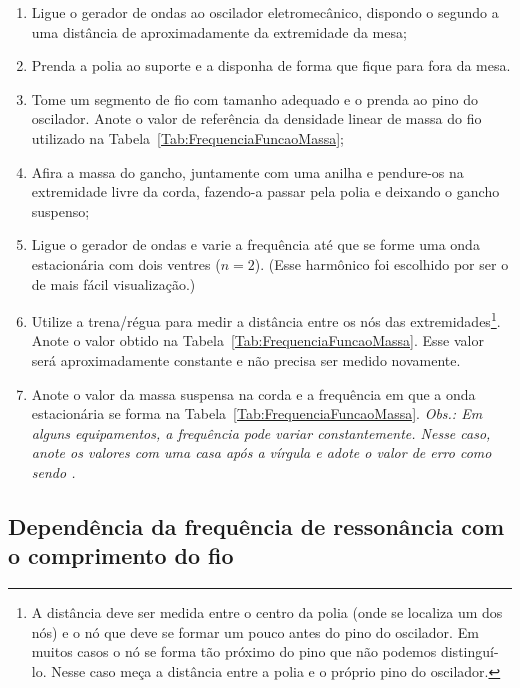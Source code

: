 \begin{enumerate}
\item Ligue o gerador de ondas ao oscilador eletromecânico, dispondo o segundo a uma distância de aproximadamente  da extremidade da mesa;\label{Enum:iteminicio}
\item Prenda a polia ao suporte e a disponha de forma que fique para fora da mesa.
\item Tome um segmento de fio com tamanho adequado e o prenda ao pino do oscilador. Anote o valor de referência da densidade linear de massa do fio utilizado na Tabela~\ref{Tab:FrequenciaFuncaoMassa};
\item Afira a massa do gancho, juntamente com uma anilha e pendure-os na extremidade livre da corda, fazendo-a passar pela polia e deixando o gancho suspenso;\label{Enum:itemfim}
\item Ligue o gerador de ondas e varie a frequência até que se forme uma onda estacionária com dois ventres ($n =2$). (Esse harmônico foi escolhido por ser o de mais fácil visualização.)
\item Utilize a trena/régua para medir a distância entre os nós das extremidades\footnote{A distância deve ser medida entre o centro da polia (onde se localiza um dos nós) e o nó que deve se formar um pouco antes do pino do oscilador. Em muitos casos o nó se forma tão próximo do pino que não podemos distinguí-lo. Nesse caso meça a distância entre a polia e o próprio pino do oscilador.}. Anote o valor obtido na Tabela~\ref{Tab:FrequenciaFuncaoMassa}. Esse valor será aproximadamente constante e não precisa ser medido novamente.
\item Anote o valor da massa suspensa na corda e a frequência em que a onda estacionária se forma na Tabela~\ref{Tab:FrequenciaFuncaoMassa}. \emph{Obs.: Em alguns equipamentos, a frequência pode variar constantemente. Nesse caso, anote os valores com uma casa após a vírgula e adote o valor de erro como sendo .}
\end{enumerate}

\subsection{Dependência da frequência de ressonância com o comprimento do fio}

